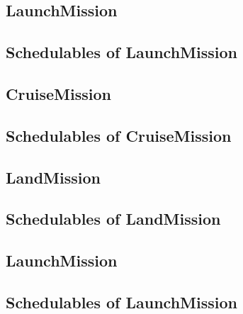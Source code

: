 \documentclass[10pt,a4paper]{article}
\begin{document}

\subsection{LaunchMission}

\newpage

\subsection{Schedulables of LaunchMission}


\newpage


\subsection{CruiseMission}

\newpage

\subsection{Schedulables of CruiseMission}


\newpage


\newpage


\newpage


\subsection{LandMission}

\newpage

\subsection{Schedulables of LandMission}


\newpage


\newpage


\newpage


\subsection{LaunchMission}

\newpage

\subsection{Schedulables of LaunchMission}
\end{document}
